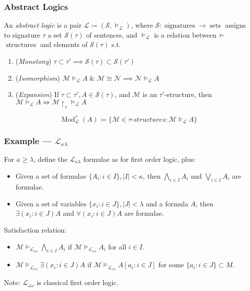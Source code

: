 \documentclass[UTF8,11pt,colorlinks,compress,openany]{beamer}%
\begin{document}
\begin{frame}\frametitle{Abstract Logics}
	\begin{definition}
		An \emph{abstract logic} is a pair $\mathcal{L}\coloneqq (\mathcal{S},\vDash_{\mathcal{L}})$, where $\mathcal{S}:\operatorname{signatures}\to\operatorname{sets}$ assigns to signature $\tau$ a set $\mathcal{S}(\tau)$ of sentences, and $\vDash_{\mathcal{L}}$ is a relation between $\tau$-$\operatorname{structures}$ and elements of
		$\mathcal{S}(\tau)$ s.t.
		\begin{enumerate}
			\item (\emph{Monotony}) $\tau\subset\tau'\implies \mathcal{S}(\tau) \subset \mathcal{S}(\tau')$
			\item (\emph{Isomorphism}) $\mathcal{M}\vDash_{\mathcal{L}} A\;\&\;\mathcal{M} \cong \mathcal{N}\implies\mathcal{N}\vDash_{\mathcal{L}}	 A$
			\item (\emph{Expansion}) If $\tau\subset\tau', A\in \mathcal{S}(\tau)$, and $\mathcal{M}$ is an $\tau'$-structure, then $\mathcal{M}\vDash_{\mathcal{L}} A\iff\mathcal{M}{\restriction_\tau}\vDash_{\mathcal{L}} A$
		\end{enumerate}
	\end{definition}
	\[\operatorname{Mod}_{\mathcal{L}}^\tau(A)\coloneqq \big\{\mathcal{M}\in\tau\text{-}structures:\mathcal{M}\vDash_{\mathcal{L}} A\big\}\]
\end{frame}

\begin{frame}\frametitle{Example --- $\mathcal{L}_{\kappa\lambda}$}
	For $\kappa\geq\lambda$, define the $\mathcal{L}_{\kappa\lambda}$ formulae as for first order logic, plus:
	\begin{itemize}
		\item Given a set of formulae $\{A_i: i\in I\}, |I|<\kappa$, then $\bigwedge\limits_{i\in I} A_i$ and $\bigvee\limits_{i\in I} A_i$ are formulae.
		\item Given a set of variables $\{x_i: i\in J\}, |J|<\lambda$ and a formula $A$, then $\exists(x_i: i\in J) A$ and $\forall(x_i: i\in J) A$ are formulae.
	\end{itemize}
	Satisfaction relation:
	\begin{itemize}
		\item $\mathcal{M}\vDash_{\mathcal{L}_{\kappa\lambda}}\bigwedge\limits_{i\in I} A_i$ if $\mathcal{M}\vDash_{\mathcal{L}_{\kappa\lambda}} A_i$ for all $i\in I$.
		\item $\mathcal{M}\vDash_{\mathcal{L}_{\kappa\lambda}}\exists(x_i: i\in J) A$ if $\mathcal{M}\vDash_{\mathcal{L}_{\kappa\lambda}} A[a_i: i\in J]$ for some $\{a_i: i\in J\}\subset M$.
	\end{itemize}
	Note: $\mathcal{L}_{\omega\omega}$ is classical first order logic.
\end{frame}
\end{document}
